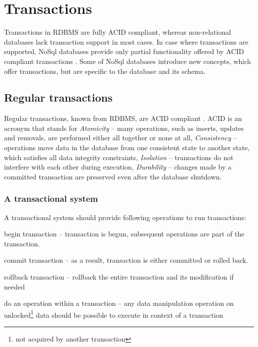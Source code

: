 \section{Transactions}\label{sec:theory:transactions}
Transactions in RDBMS are fully ACID compliant, whereas non-relational databases lack transaction support in most cases. 
In case where transactions are supported, NoSql databases provide only partial functionality offered by ACID compliant transactions \cite{StonebrakerSqlVsNosql}. 
Some of NoSql databases introduce new concepts, which offer transactions, but are specific to the database and its schema.


\subsection{Regular transactions}
Regular transactions, known from RDBMS, are ACID compliant \cite{ACID}. ACID is an acronym that stands for \emph{Atomicity} -- many operations, such as inserts, updates and removals, are performed either all together or none at all, \emph{Consistency} -- operations move data in the database from one consistent state to another state, which satisfies all data integrity constraints, \emph{Isolation} -- transactions do not interfere with each other during execution, \emph{Durability} -- changes made by a committed transaction are preserved even after the database shutdown.

\subsubsection{A transactional system}
A transactional system should provide following operations to run transactions:
\begin{enumerate*}[label=\alph*)]
\item begin transaction -- transaction is begun, subsequent operations are part of the transaction. 
\item commit transaction -- as a result, transaction is either committed or rolled back.
\item rollback transaction -- rollback the entire transaction and its modification if needed
\item do an operation within a transaction -- any data manipulation operation on unlocked\footnote{not acquired by another transaction} data should be possible to execute in context of a transaction
\end{enumerate*}


